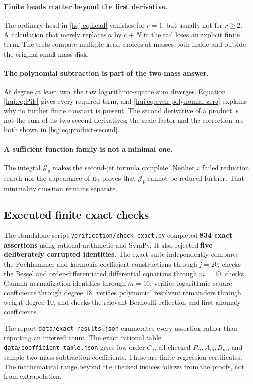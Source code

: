 \documentclass[11pt,letterpaper]{article}
\numberwithin{equation}{section}
\theoremstyle{definition}
\newcommand{\file}[1]{\nolinkurl{#1}}
\begin{document}
\paragraph{Finite heads matter beyond the first derivative.}
The ordinary head in \eqref{hqj:eq:head} vanishes for $r=1$, but
usually not for $r\ge2$. A calculation that merely replaces $a$ by
$a+N$ in the tail loses an explicit finite term. The tests compare
multiple head choices at masses both inside and outside the original
small-mass disk.

\paragraph{The polynomial subtraction is part of the two-mass answer.}
At degree at least two, the raw logarithmic-square sum diverges.
Equation \eqref{hqj:eq:PiP} gives every required term, and
\eqref{hqj:eq:even-polynomial-zero} explains why no further finite
constant is present. The second derivative of a product is not the
sum of its two second derivatives; the scale factor and the correction
are both shown in \eqref{hqj:eq:product-second}.

\paragraph{A sufficient function family is not a minimal one.}
The integral $\mathcal J_p$ makes the second-jet formula complete.
Neither a failed reduction search nor the appearance of $E_1$ proves
that $\mathcal J_p$ cannot be reduced further. That minimality question
remains separate.

\subsection{Executed finite exact checks}
The standalone script \file{verification/check_exact.py} completed
\textbf{834 exact assertions} using rational arithmetic and SymPy.
It also rejected \textbf{five deliberately corrupted identities}.
The exact suite independently compares the Pochhammer and harmonic
coefficient constructions through $j=20$, checks the Bessel and
order-differentiated differential equations through $m=10$, checks
Gamma-normalization identities through $m=16$, verifies logarithmic-square
coefficients through degree $18$, verifies polynomial resolvent
remainders through weight degree $10$, and checks the relevant
Bernoulli reflection and first-anomaly coefficients.

The report \file{data/exact_results.json} enumerates every assertion
rather than reporting an inferred count. The exact rational table
\file{data/coefficient_table.json} gives low-order $C_j$, all checked
$P_m,A_m,B_m$, and sample two-mass subtraction coefficients. These are
finite regression certificates. The mathematical range beyond the
checked indices follows from the proofs, not from extrapolation.
\end{document}
